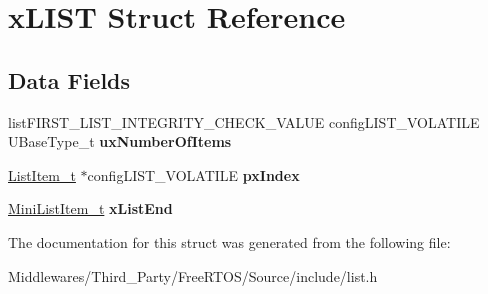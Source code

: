 \hypertarget{structx_l_i_s_t}{}\section{x\+L\+I\+ST Struct Reference}
\label{structx_l_i_s_t}
\subsection*{Data Fields}
\begin{DoxyCompactItemize}
\item 
\mbox{\label{structx_l_i_s_t_a17b9828dd40520fcda9127b4cb4c0c0c}} 
list\+F\+I\+R\+S\+T\+\_\+\+L\+I\+S\+T\+\_\+\+I\+N\+T\+E\+G\+R\+I\+T\+Y\+\_\+\+C\+H\+E\+C\+K\+\_\+\+V\+A\+L\+UE config\+L\+I\+S\+T\+\_\+\+V\+O\+L\+A\+T\+I\+LE U\+Base\+Type\+\_\+t {\bfseries ux\+Number\+Of\+Items}
\item 
\mbox{\label{structx_l_i_s_t_ae8639154918acc3f75d718480322aa82}} 
\mbox{\hyperlink{structx_l_i_s_t___i_t_e_m}{List\+Item\+\_\+t}} $\ast$config\+L\+I\+S\+T\+\_\+\+V\+O\+L\+A\+T\+I\+LE {\bfseries px\+Index}
\item 
\mbox{\label{structx_l_i_s_t_a83a65be4e3a2bb70855742896126bf63}} 
\mbox{\hyperlink{structx_m_i_n_i___l_i_s_t___i_t_e_m}{Mini\+List\+Item\+\_\+t}} {\bfseries x\+List\+End}
\end{DoxyCompactItemize}


The documentation for this struct was generated from the following file\+:\begin{DoxyCompactItemize}
\item 
Middlewares/\+Third\+\_\+\+Party/\+Free\+R\+T\+O\+S/\+Source/include/list.\+h\end{DoxyCompactItemize}
